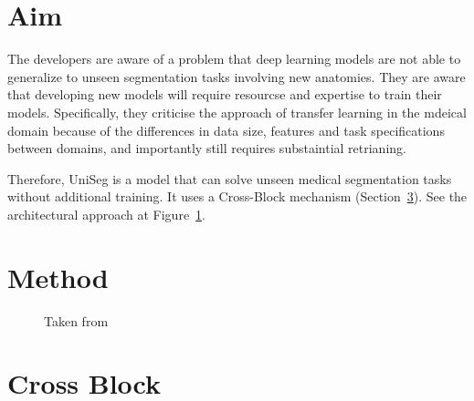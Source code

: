 \documentclass[11pt]{article}
\begin{document}


\tableofcontents

\clearpage

\section{Aim}

The developers are aware of a problem that deep learning models are not able to generalize to unseen segmentation tasks involving new anatomies. They are aware that developing new models will require resourcse and expertise to train their models. Specifically, they criticise the approach of transfer learning in the mdeical domain because of the differences in data size, features and task specifications between domains, and importantly still requires substaintial retrianing. 

\vspace{1em}

Therefore, UniSeg is a model that can solve unseen medical segmentation tasks without additional training. It uses a Cross-Block mechanism (Section~\ref{sec:cross-block}). See the architectural approach at Figure~\ref{fig:arch-comparison}.

\section{Method}

\begin{figure}[H]
    \centering
    \caption{Taken from~\cite{universeg}}\label{fig:arch-comparison}
\end{figure}



\section{Cross Block}\label{sec:cross-block}

\printbibliography
\end{document}
